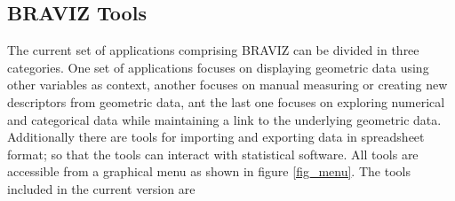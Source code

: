 \documentclass[utf8]{frontiersSCNS} %
\begin{document}


\subsection{BRAVIZ Tools}


The current set of applications comprising BRAVIZ can be divided in three categories. One set of applications focuses on displaying geometric data using other variables as context, another focuses on manual measuring or creating new descriptors from geometric data, ant the last one focuses on exploring numerical and categorical data while maintaining a link to the underlying geometric data. Additionally there are tools for importing and exporting data in spreadsheet format; so that the tools can interact with statistical software. All tools are accessible from a graphical menu as shown in figure \ref{fig_menu}. The tools included in the current version are
\end{document}
